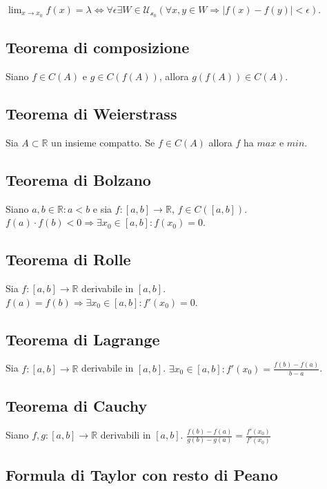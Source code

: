 \documentclass{article}
\begin{document}
 $\lim_{x \to x_0}f(x)= \lambda \iff \forall\epsilon \exists W \in \mathcal{U_{x_0}} (\forall x,y \in W \Rightarrow |f(x)-f(y)|<\epsilon)$.

\subsection{Teorema di composizione}

Siano $f \in C(A)$ e $g\in C(f(A))$, allora $g(f(A)) \in C(A)$.

\subsection{Teorema di Weierstrass}

Sia $A \subset \mathbb{R}$ un insieme compatto. Se $f \in C(A)$ allora $f$ ha $max$ e $min$.

\subsection{Teorema di Bolzano}

Siano $a,b \in \mathbb{R}: a<b$ e sia $f:[a,b] \rightarrow \mathbb{R}$, $f \in C([a,b])$. $f(a) \cdot f(b)< 0 \Rightarrow \exists x_0 \in [a,b]: f(x_0)=0$.

\subsection{Teorema di Rolle}

Sia $f:[a,b]\rightarrow \mathbb{R}$ derivabile in $[a,b]$. $f(a)=f(b) \Rightarrow \exists x_0 \in [a,b]: f'(x_0)=0$.

\subsection{Teorema di Lagrange}

Sia $f:[a,b]\rightarrow \mathbb{R}$ derivabile in $[a,b]$. $\exists x_0 \in [a,b]: f'(x_0)=\frac{f(b)-f(a)}{b-a}$.

\subsection{Teorema di Cauchy}

Siano $f,g:[a,b]\rightarrow \mathbb{R}$ derivabili in $[a,b]$. $\frac{f(b)-f(a)}{g(b)-g(a)}=\frac{f'(x_0)}{f'(x_0)}$

\subsection{Formula di Taylor con resto di Peano}
\end{document}
